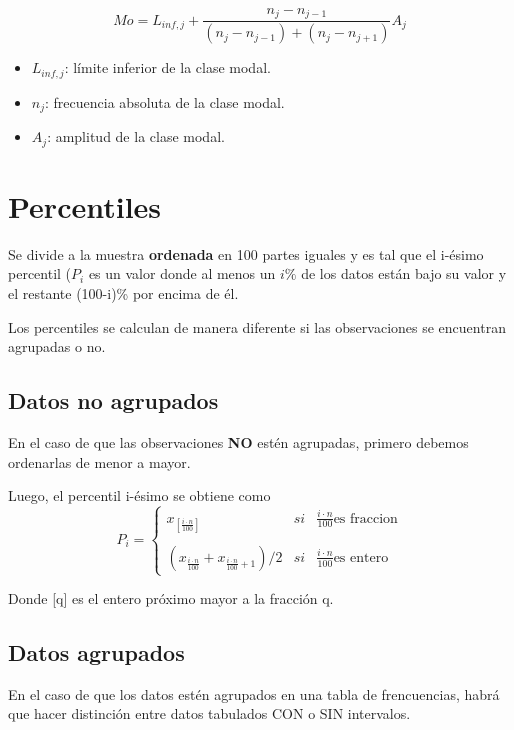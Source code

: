 \documentclass[12pt,twocolumn,a4paper]{report}
\begin{document}
\begin{equation*}
Mo = L_{inf,j} + \frac{n_j - n_{j-1}}{(n_j - n_{j-1})+(n_j - n_{j+1})} A_j 
\end{equation*}
\begin{itemize}
\setlength\itemsep{0.001cm}
\item{$L_{inf,j}$: límite inferior de la clase modal.}
\item{$n_j$: frecuencia absoluta de la clase modal.}
\item{$A_j$: amplitud de la clase modal. }
\end{itemize}

\section*{Percentiles}
Se divide a la muestra \textbf{ordenada} en 100 partes iguales y es tal que el i-ésimo percentil ($P_i$ es un valor donde al menos un $i\%$ de los datos están bajo su valor y el restante (100-i)\% por encima de él. 

Los percentiles se calculan de manera diferente si las observaciones se encuentran agrupadas o no.

\subsection*{Datos no agrupados}
En el caso de que las observaciones \textbf{NO} estén agrupadas, primero debemos ordenarlas de menor a mayor. 

Luego, el percentil i-ésimo se obtiene como
\begin{equation*}
P_i= \left\{ \begin{array}{lcc}
             x_{\left[\frac{i\cdot n}{100}\right]} & si & \frac{i\cdot n}{100} \text{es fraccion} \\
             \\ (x_{\frac{i\cdot n}{100}}+x_{\frac{i\cdot n}{100}+1})/2 & si & \frac{i\cdot n}{100} \text{es entero}
             \end{array}
   \right.
\end{equation*}

Donde [q] es el entero próximo mayor a la fracción q. 

\subsection*{Datos agrupados}
En el caso de que los datos estén agrupados en una tabla de frencuencias, habrá que hacer distinción entre datos tabulados CON o SIN intervalos. 
\end{document}
